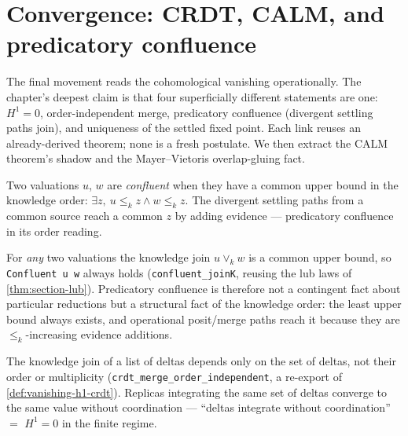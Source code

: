\section{Convergence: CRDT, CALM, and predicatory confluence}

The final movement reads the cohomological vanishing operationally. The chapter's deepest claim is that four superficially different statements are one: $H^1 = 0$, order-independent merge, predicatory confluence (divergent settling paths join), and uniqueness of the settled fixed point. Each link reuses an already-derived theorem; none is a fresh postulate. We then extract the CALM theorem's shadow and the Mayer--Vietoris overlap-gluing fact.

\begin{definition}\label{def:confluent}\leanok{}
Two valuations $u$, $w$ are \emph{confluent} when they have a common upper bound in the knowledge order: $\exists z,\ u \leq_k z \wedge w \leq_k z$. The divergent settling paths from a common source reach a common $z$ by adding evidence --- predicatory confluence in its order reading.
\end{definition}

\begin{theorem}\leanok{}
For \emph{any} two valuations the knowledge join $u \vee_k w$ is a common upper bound, so \texttt{Confluent u w} always holds (\texttt{confluent\_joinK}, reusing the lub laws of \cref{thm:section-lub}). Predicatory confluence is therefore not a contingent fact about particular reductions but a structural fact of the knowledge order: the least upper bound always exists, and operational posit/merge paths reach it because they are $\leq_k$-increasing evidence additions.
\end{theorem}

\begin{theorem}\leanok{}
The knowledge join of a list of deltas depends only on the set of deltas, not their order or multiplicity (\texttt{crdt\_merge\_order\_independent}, a re-export of \cref{def:vanishing-h1-crdt}). Replicas integrating the same set of deltas converge to the same value without coordination --- ``deltas integrate without coordination'' $=$ $H^1 = 0$ in the finite regime.
\end{theorem}

